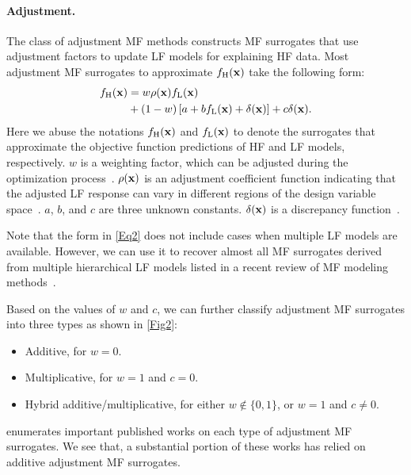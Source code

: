 \documentclass[iicol,sn-basic]{sn-jnl}%
\begin{document}
\paragraph{Adjustment.}
The class of adjustment MF methods constructs MF surrogates that use adjustment factors to update LF models for explaining HF data.
Most adjustment MF surrogates to approximate $f_\text{H}({\bf x})$ take the following form:
\begin{equation}\label{Eq2}
	\begin{aligned}
	 f_\text{H}({\bf x}) & = w \rho({\bf x}) f_\text{L}({\bf x})\\
	&+ (1-w)\left[a + b f_\text{L}({\bf x}) + \delta({\bf x})\right]+ c \delta({\bf x}).
\end{aligned}
\end{equation}
Here we abuse the notations $f_\text{H}({\bf x})$ and $f_\text{L}(\bf x)$ to denote the surrogates that approximate the objective function predictions of HF and LF models, respectively.
$w$ is a weighting factor, which can be adjusted during the optimization process~\citep{Gano2005}.
$\rho({\bf {x}})$ is an adjustment coefficient function indicating that the adjusted LF response can vary in different regions of the design variable space~\citep{Haftka1991}.
$a$, $b$, and $c$ are three unknown constants.
$\delta({\bf{x}})$ is a discrepancy function~\citep{Kennedy2000}.

Note that the form in \cref{Eq2} does not include cases when multiple LF models are available.
However, we can use it to recover almost all MF surrogates derived from multiple hierarchical LF models listed in a recent review of MF modeling methods~\citep{FernandezGodino2016}.

Based on the values of $w$ and $c$, we can further classify adjustment MF surrogates into three types as shown in \cref{Fig2}:
\begin{itemize}
	\item Additive, for $w=0$.
	
	\item Multiplicative, for $w=1$ and $c=0$.
	
	\item Hybrid additive/multiplicative, for either $w \notin \{0,1\}$, or $w=1$ and $c \neq 0$.
\end{itemize}

 enumerates important published works on each type of adjustment MF surrogates.
We see that, a substantial portion of these works has relied on additive adjustment MF surrogates. 
\end{document}
